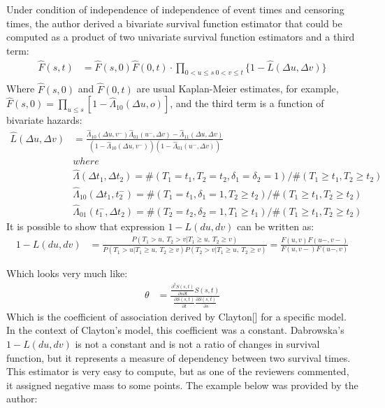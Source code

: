 \documentclass[]{article}
\begin{document}
Under condition of independence of independence of event times and censoring times, the author derived a bivariate survival function estimator that could be computed as a product of two univariate survival function estimators and a third term:
	$$
	\begin{aligned}
		\hat{F}(s,t) &= \hat{F}(s,0)\hat{F}(0,t)\cdot \prod_{{0<u\leq s~0<v\leq t}}\{1 - \hat{L}(\Delta u, \Delta v)\}\\
	\end{aligned}
	$$
Where $\hat{F}(s,0)$ and $\hat{F}(0,t)$ are usual Kaplan-Meier estimates, for example, $\hat{F}(s,0) = \prod_{u\leq s}[1-\hat{\Lambda}_{10}(\Delta u, o)]$, and the third term is a function of bivariate hazards:
	$$
	\begin{aligned}
    \hat{L}(\Delta u, \Delta v) &= \frac{\hat{\Lambda}_{10}(\Delta u,v^-)\hat{\Lambda}_{01}(u^-,\Delta v) - \hat{\Lambda}_{11}(\Delta u,\Delta v)}{\left(1-\hat{\Lambda}_{10}(\Delta u,v^-)\right)\left(1-\hat{\Lambda}_{01}(u^-,\Delta v)\right)}\\
  &where\\
	&\hat{\Lambda}(\Delta t_1, \Delta t_2) = \#(T_1=t_1, T_2=t_2, \delta_1=\delta_2=1)/\#(T_1\geq t_1, T_2\geq t_2)\\
	&\hat{\Lambda}_{10}(\Delta t_1, t_2^-) = \#(T_1=t_1, \delta_1=1, T_2\geq t_2)/\#(T_1\geq t_1, T_2\geq t_2)\\
	&\hat{\Lambda}_{01}(t_1^-,\Delta  t_2) = \#(T_2=t_2, \delta_2=1, T_1\geq t_1)/\#(T_1\geq t_1, T_2\geq t_2)		
	\end{aligned}
	$$
It is possible to show that expression $1-L(du, dv)$ can be written as:
	$$
	\begin{aligned}
		1 - L(du, dv) &= \frac{P(T_1>u,~T_2>v|T_1\geq u,~T_2\geq v)}  {P(T_1>u|T_1\geq u,~T_2\geq v)P(T_2>v|T_1\geq u,~T_2\geq v)} =
		\frac{ F(u,v)F(u-,v-) }{ F(u,v-)F(u-,v) }
	\end{aligned}
	$$

Which looks very much like:
	$$
	\begin{aligned}
		\theta &= \frac{ \frac{\partial^2 S(s,t)}{\partial s \partial t} S(s, t)}    {\frac{\partial S(s, t)}{\partial t} \frac{\partial S(s, t)}{\partial s}}
	\end{aligned}
	$$
Which is the coefficient of association derived by Clayton[\cite{clayton1978model}] for a specific model. In the context of  Clayton's model, this coefficient was a constant. Dabrowska's  $1-L(du, dv)$ is not a constant and is not a ratio of changes in survival function, but it represents a measure of dependency between two survival times.\\
This estimator is very easy to compute, but as one of the reviewers commented, it assigned negative mass to some points. The example below was provided by the author:
\end{document}
